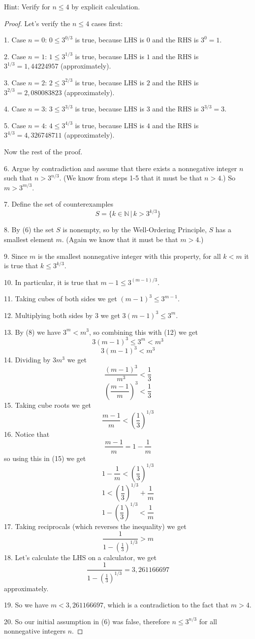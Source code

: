 \documentclass[14pt]{extarticle}
\begin{document}
Hint: Verify for $n \leq 4$ by explicit calculation.
\begin{proof}
Let's verify the $n \leq 4$ cases first:

1. Case $n = 0$: $0 \leq 3^{0/3}$ is true, because LHS is $0$ and the RHS is $3^0 = 1$.

2. Case $n = 1$: $1 \leq 3^{1/3}$ is true, because LHS is $1$ and the RHS is $3^{1/3} = 1,44224957$ (approximately).

3. Case $n = 2$: $2 \leq 3^{2/3}$ is true, because LHS is $2$ and the RHS is $3^{2/3} = 2,080083823$ (approximately).

4. Case $n = 3$: $3 \leq 3^{3/3}$ is true, because LHS is $3$ and the RHS is $3^{3/3} = 3$.

5. Case $n = 4$: $4 \leq 3^{4/3}$ is true, because LHS is $4$ and the RHS is $3^{4/3} = 4,326748711$ (approximately).

Now the rest of the proof.

6. Argue by contradiction and assume that there exists a nonnegative integer $n$ such that $n > 3^{n/3}$. (We know from steps 1-5 that it must be that $n > 4$.) So $m > 3^{m/3}$.

7. Define the set of counterexamples
$$
S = \{k \in \mathbb{N} \, | \, k > 3^{k/3}\}
$$

8. By (6) the set $S$ is nonempty, so by the Well-Ordering Principle, $S$ has a smallest element $m$. (Again we know that it must be that $m > 4$.)

9. Since $m$ is the smallest nonnegative integer with this property, for all $k < m$ it is true that $k \leq 3^{k/3}$.

10. In particular, it is true that $m-1 \leq 3^{(m-1)/3}$.

11. Taking cubes of both sides we get $(m-1)^3 \leq 3^{m-1}$.

12. Multiplying both sides by 3 we get $3(m-1)^3 \leq 3^m$.

13. By (8) we have $3^m < m^3$, so combining this with (12) we get
$$
3(m-1)^3 \leq 3^m < m^3
$$
$$
3(m-1)^3 < m^3
$$
14. Dividing by $3m^3$ we get
$$
\frac{(m-1)^3}{m^3} < \frac{1}{3}
$$
$$
\left(\frac{m-1}{m}\right)^3 < \frac{1}{3}
$$
15. Taking cube roots we get
$$
\frac{m-1}{m} < \left(\frac{1}{3}\right)^{1/3}
$$
16. Notice that
$$
\frac{m-1}{m} = 1 - \frac{1}{m}
$$
so using this in (15) we get
$$
1 - \frac{1}{m} < \left(\frac{1}{3}\right)^{1/3}
$$
$$
1 < \left(\frac{1}{3}\right)^{1/3} + \frac{1}{m}
$$
$$
1 - \left(\frac{1}{3}\right)^{1/3} < \frac{1}{m}
$$
17. Taking reciprocals (which reverses the inequality) we get
$$
\frac{1}{1 - \left(\frac{1}{3}\right)^{1/3}} > m
$$
18. Let's calculate the LHS on a calculator, we get 
$$
\frac{1}{1 - \left(\frac{1}{3}\right)^{1/3}} = 3,261166697
$$
approximately.

19. So we have $m < 3,261166697$, which is a contradiction to the fact that $m > 4$.

20. So our initial assumption in (6) was false, therefore $n \leq 3^{n/3}$ for all nonnegative integers $n$.
\end{proof}
\end{document}
